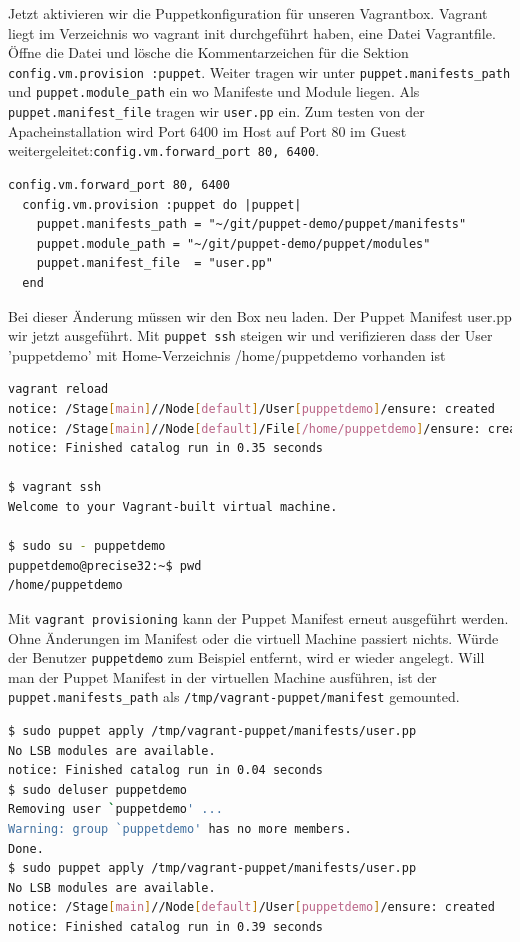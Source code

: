 \documentclass[12pt,a4paper,ngerman]{article}
\begin{document}
Jetzt aktivieren wir die Puppetkonfiguration für unseren Vagrantbox. Vagrant liegt im Verzeichnis wo vagrant init durchgeführt haben, eine Datei Vagrantfile.
Öffne die Datei und lösche die Kommentarzeichen für die Sektion \lstinline$config.vm.provision :puppet$. Weiter tragen wir unter \lstinline$puppet.manifests_path$ und \lstinline$puppet.module_path$ ein wo Manifeste und Module liegen. Als \lstinline$puppet.manifest_file$ tragen wir \lstinline$user.pp$ ein. Zum testen von der Apacheinstallation wird Port 6400 im Host auf Port 80 im Guest weitergeleitet:\lstinline$config.vm.forward_port 80, 6400$.
  
\begin{lstlisting}[language=vagrant,caption=Puppet Provisioning in Vagrantfile konfigurieren, label=vagrantprovisioning]
  config.vm.forward_port 80, 6400  
  config.vm.provision :puppet do |puppet|
    puppet.manifests_path = "~/git/puppet-demo/puppet/manifests"
    puppet.module_path = "~/git/puppet-demo/puppet/modules"
    puppet.manifest_file  = "user.pp"
  end
\end{lstlisting} 

Bei dieser Änderung müssen wir den Box neu laden. Der Puppet Manifest user.pp wir jetzt ausgeführt. Mit \lstinline$puppet ssh$ steigen wir und verifizieren dass der User 'puppetdemo' mit Home-Verzeichnis /home/puppetdemo vorhanden ist

\begin{lstlisting}[language=sh,caption=Vagrant Box neu laden, label=vagrant-reload]
vagrant reload
notice: /Stage[main]//Node[default]/User[puppetdemo]/ensure: created
notice: /Stage[main]//Node[default]/File[/home/puppetdemo]/ensure: created
notice: Finished catalog run in 0.35 seconds

$ vagrant ssh
Welcome to your Vagrant-built virtual machine.

$ sudo su - puppetdemo
puppetdemo@precise32:~$ pwd
/home/puppetdemo
\end{lstlisting}

Mit \lstinline$vagrant provisioning$ kann der Puppet Manifest erneut ausgeführt werden. Ohne Änderungen im Manifest oder die virtuell Machine passiert nichts. Würde der Benutzer \lstinline$puppetdemo$ zum Beispiel entfernt, wird er wieder angelegt.
Will man der Puppet Manifest in der virtuellen Machine ausführen, ist der \lstinline$puppet.manifests_path$ als \lstinline$/tmp/vagrant-puppet/manifest$ gemounted.

\begin{lstlisting}[language=sh,caption=Puppet apply im Box, label=vagrant-apply]
$ sudo puppet apply /tmp/vagrant-puppet/manifests/user.pp
No LSB modules are available.
notice: Finished catalog run in 0.04 seconds
$ sudo deluser puppetdemo
Removing user `puppetdemo' ...
Warning: group `puppetdemo' has no more members.
Done.
$ sudo puppet apply /tmp/vagrant-puppet/manifests/user.pp
No LSB modules are available.
notice: /Stage[main]//Node[default]/User[puppetdemo]/ensure: created
notice: Finished catalog run in 0.39 seconds
\end{lstlisting}
\end{document}
